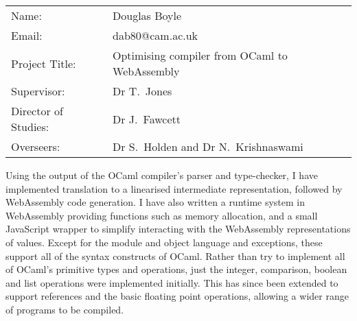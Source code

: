 \documentclass[a4paper,12pt,twoside]{report} %
\def\authorname{Douglas Boyle\xspace}
\def\authorcollege{Churchill College\xspace}
\def\dissertationtitle{Optimising compiler from OCaml to WebAssembly}
\begin{document}
%
%
%











{\large
\begin{tabular}{ll}
Name:               & \authorname     \\
Email: 		& {dab80@cam.ac.uk} \\
Project Title:      & \dissertationtitle \\
Supervisor:         &  Dr T.~Jones                   \\ 
Director of Studies: & Dr J.~Fawcett \\
Overseers: & Dr S.~Holden and Dr N.~Krishnaswami
\end{tabular}
}

Using the output of the OCaml compiler's parser and type-checker, I have implemented translation to a linearised intermediate representation, followed by WebAssembly code generation. I have also written a runtime system in WebAssembly providing functions such as memory allocation, and a small JavaScript wrapper to simplify interacting with the WebAssembly representations of values. Except for the module and object language and exceptions, these support all of the syntax constructs of OCaml. Rather than try to implement all of OCaml's primitive types and operations, just the integer, comparison, boolean and list operations were implemented initially. This has since been extended to support references and the basic floating point operations, allowing a wider range of programs to be compiled. 
\end{document}

